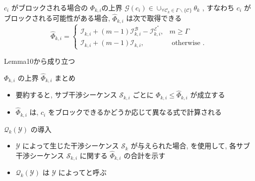 \begin{frame}{$c_{i}$ がブロックされる場合の $\Phi_{k, i}$の上界}
    $\mathcal{G}\left(c_{i}\right) \in \cup_{\forall \mathcal{C}_{k} \in \Gamma \backslash\{\mathcal{C}\}} \theta_{k}$ , すなわち $c_{i}$ がブロックされる可能性がある場合, $\hat{\Phi}_{k, i}$ は次で取得できる
    \begin{equation*}
        \hat{\Phi}_{k, i}=\left\{\begin{array}{lr}
            \mathcal{I}_{k, i}+(m-1) \mathcal{I}_{k, i}^{\mathcal{B}}-\mathcal{I}_{k, i}^{\mathcal{E}^{*}}, & m \geq \Gamma         \\
            \mathcal{I}_{k, i}+(m-1) \mathcal{I}_{k, i},                                                    & \text { otherwise } .
        \end{array}\right.
    \end{equation*}

    Lemma10から成り立つ
\end{frame}

\begin{frame}{$\Phi_{k, i}$ の上界 $\hat{\Phi}_{k, i}$ まとめ}
    \begin{itemize}
        \item 要約すると, サブ干渉シーケンス $\mathcal{S}_{k, i}$ ごとに $\Phi_{k, i} \leq \hat{\Phi}_{k, i}$ が成立する
        \item $\hat{\Phi}_{k, i}$ は, $c_{i}$ をブロックできるかどうか応じて異なる式で計算される
    \end{itemize}
\end{frame}

\begin{frame}{$\mathcal{Q}_{k}(\mathcal{Y})$ の導入}
    \begin{itemize}
        \item $\mathcal{Y}$ によって生じた干渉シーケンス $\mathcal{S}_{k}$ が与えられた場合,  を使用して, 各サブ干渉シーケンス $\mathcal{S}_{k, i}$ に関する $\hat{\Phi}_{k, i}$ の合計を示す
        \item $\mathcal{Q}_{k}(\mathcal{Y})$ は $\mathcal{Y}$ によってと呼ぶ
    \end{itemize}
\end{frame}

